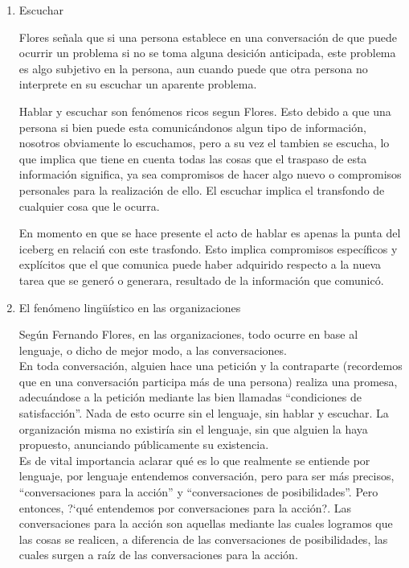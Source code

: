 \begin{enumerate}
	\item Escuchar

Flores se\~nala que si una persona establece en una conversaci\'on de que puede
 ocurrir un problema si no se toma alguna desici\'on anticipada, este problema
 es algo subjetivo en la persona, aun cuando puede que otra persona no interprete
 en su escuchar un aparente problema.

Hablar y escuchar son fen\'omenos ricos segun Flores. Esto debido a que una
 persona si bien puede esta comunic\'andonos algun tipo de informaci\'on,
 nosotros obviamente lo escuchamos, pero a su vez el tambien se escucha, 
lo que implica que tiene en cuenta todas las cosas que el traspaso de esta
 informaci\'on significa, ya sea compromisos de hacer algo nuevo o compromisos
 personales para la realizaci\'on de ello. El escuchar implica el transfondo 
de cualquier cosa que le ocurra.

En momento en que se hace presente el acto de hablar es apenas la punta del 
iceberg en relaci\'n con este trasfondo. Esto implica compromisos espec\'ificos
 y expl\'icitos que el que comunica puede haber adquirido respecto a la nueva
 tarea que se gener\'o o generara, resultado de la informaci\'on que comunic\'o.


	\item El fen\'omeno ling\"u\'istico en las organizaciones

Seg\'un Fernando Flores, en las organizaciones, todo ocurre en base al
lenguaje, o dicho de mejor modo, a las conversaciones.\\
En toda conversaci\'on, alguien hace una petici\'on y la contraparte
(recordemos que en una conversaci\'on participa m\'as de una persona) realiza
una promesa, adecu\'andose a la petici\'on mediante las bien llamadas
``condiciones de satisfacci\'on''. Nada de esto ocurre sin el lenguaje, sin hablar y
escuchar. La organizaci\'on misma no existir\'ia sin el lenguaje, sin que alguien la
haya propuesto, anunciando p\'ublicamente su existencia.\\

Es de vital importancia aclarar qu\'e es lo que realmente se entiende por
lenguaje, por lenguaje entendemos conversaci\'on, pero para ser m\'as precisos,
``conversaciones para la acci\'on'' y ``conversaciones de posibilidades''. Pero
entonces, ?`qu\'e entendemos por conversaciones para la acci\'on?. Las
conversaciones para la acci\'on son aquellas mediante las cuales logramos que
las cosas se realicen, a diferencia de las conversaciones de posibilidades, las
cuales surgen a ra\'iz de las conversaciones para la acci\'on.\\


\end{enumerate}
